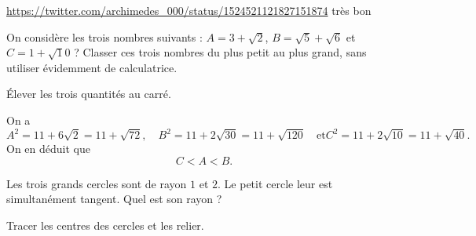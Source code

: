 \begin{exo}[]\url{https://twitter.com/archimedes_000/status/1524521121827151874} très bon
\begin{center}
\begin{tikzpicture}[scale=1]
\end{tikzpicture}
\end{center}
\begin{hint}
\end{hint}
\end{exo}


\begin{exo}

On considère les trois nombres suivants : $A=3+\sqrt 2$, $B=\sqrt 5 +\sqrt 6$ et $C=1+\sqrt 10$ ?
Classer ces trois nombres du plus petit au plus grand, sans utiliser évidemment de calculatrice.
\begin{hint}
Élever les trois quantités au carré.
\end{hint}
\begin{sol}
On a 
\[
A^2 = 11+6\sqrt 2 = 11+\sqrt{72},\quad
B^2 = 11+2\sqrt{30}=11+\sqrt{120} \quad\text{et}
C^2 = 11+2\sqrt{10}=11+\sqrt{40}.\]
On en déduit que 
\[ C< A < B.\]
\end{sol}
\end{exo}


\begin{exo}
Les trois grands  cercles sont de rayon $1$ et $2$.
Le petit cercle leur est simultanément tangent. Quel est son rayon ?
\begin{center}
\end{center}
\begin{hint}
Tracer les centres des cercles et les relier.
\end{hint}
\end{exo}







